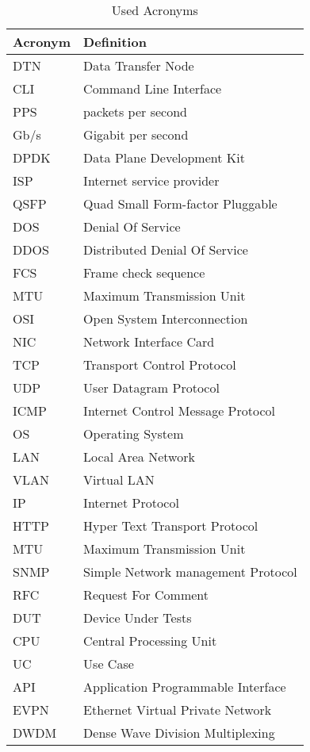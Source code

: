 \thispagestyle{empty}

\chapter{}\label{appendix:acronym}

\begin{table}[H]
\centering
\caption{Used Acronyms}
\label{table:acronyms}
\begin{tabular}{l|l}
\hline
\textbf{Acronym}                  & \textbf{Definition}  \\ \hline
DTN & Data Transfer Node \\ \hline
CLI & Command Line Interface \\ \hline
PPS & packets per second \\ \hline
Gb/s & Gigabit per second \\ \hline
DPDK & Data Plane Development Kit \\ \hline
ISP & Internet service provider \\ \hline
QSFP & Quad Small Form-factor Pluggable \\ \hline
DOS & Denial Of Service \\ \hline
DDOS & Distributed Denial Of Service \\ \hline
FCS & Frame check sequence \\ \hline
MTU & Maximum Transmission Unit \\ \hline
OSI & Open System Interconnection \\ \hline
NIC & Network Interface Card \\ \hline
TCP & Transport Control Protocol \\ \hline
UDP & User Datagram Protocol \\ \hline
ICMP & Internet Control Message Protocol \\ \hline
OS & Operating System \\ \hline
LAN & Local Area Network \\ \hline
VLAN & Virtual LAN \\ \hline
IP & Internet Protocol \\ \hline
HTTP & Hyper Text Transport Protocol \\ \hline
MTU & Maximum Transmission Unit \\ \hline
SNMP & Simple Network management Protocol \\ \hline
RFC & Request For Comment \\ \hline
DUT & Device Under Tests \\ \hline
CPU & Central Processing Unit \\ \hline
UC & Use Case \\ \hline
API & Application Programmable Interface \\ \hline
EVPN & Ethernet Virtual Private Network \\ \hline
DWDM & Dense Wave Division Multiplexing \\ \hline
\end{tabular}
\end{table}
